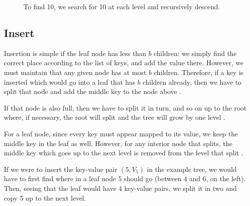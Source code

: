 \documentclass[12pt]{article}
\begin{document}
\begin{figure}[ht]
    \centering
    \caption{To find 10, we search for 10 at each level and recursively descend.}
    \label{fig:demotree2}
\end{figure}

\subsection{Insert}

Insertion is simple if the leaf node has less than $b$ children: we simply find the correct place according to the list of keys, and add the value there. However, we must maintain that any given node has at most $b$ children. Therefore, if a key is inserted which would go into a leaf that has $b$ children already, then we have to split that node and add the middle key to the node above \cite{elmasri_navathe_2011}.

If that node is also full, then we have to split it in turn, and so on up to the root where, if necessary, the root will split and the tree will grow by one level \cite{elmasri_navathe_2011}.

For a leaf node, since every key must appear mapped to its value, we keep the middle key in the leaf as well. However, for any interior node that splits, the middle key which goes up to the next level is removed from the level that split \cite{elmasri_navathe_2011}.

If we were to insert the key-value pair $(5,V_5)$ in the example tree, we would have to first find where in a leaf node 5 should go (between 4 and 6, on the left). Then, seeing that the leaf would have 4 key-value pairs, we split it in two and copy 5 up to the next level.
\end{document}
